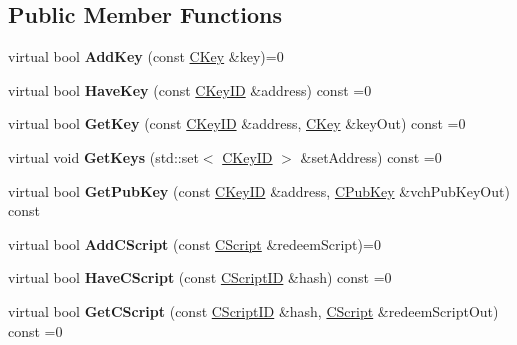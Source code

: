 \subsection*{Public Member Functions}
\begin{DoxyCompactItemize}
\item 
\mbox{\label{class_c_key_store_ae7b69414d2b00f551b2692f83f38a882}} 
virtual bool {\bfseries Add\+Key} (const \mbox{\hyperlink{class_c_key}{C\+Key}} \&key)=0
\item 
\mbox{\label{class_c_key_store_a9398451d4270fae27b29f686a9d43a65}} 
virtual bool {\bfseries Have\+Key} (const \mbox{\hyperlink{class_c_key_i_d}{C\+Key\+ID}} \&address) const =0
\item 
\mbox{\label{class_c_key_store_a2dffca468fef2e5da2e42a7c983d968a}} 
virtual bool {\bfseries Get\+Key} (const \mbox{\hyperlink{class_c_key_i_d}{C\+Key\+ID}} \&address, \mbox{\hyperlink{class_c_key}{C\+Key}} \&key\+Out) const =0
\item 
\mbox{\label{class_c_key_store_aca5044014720308f191113e7ba297d13}} 
virtual void {\bfseries Get\+Keys} (std\+::set$<$ \mbox{\hyperlink{class_c_key_i_d}{C\+Key\+ID}} $>$ \&set\+Address) const =0
\item 
\mbox{\label{class_c_key_store_ab83687ea4c9df138b21f6ec3e9809f42}} 
virtual bool {\bfseries Get\+Pub\+Key} (const \mbox{\hyperlink{class_c_key_i_d}{C\+Key\+ID}} \&address, \mbox{\hyperlink{class_c_pub_key}{C\+Pub\+Key}} \&vch\+Pub\+Key\+Out) const
\item 
\mbox{\label{class_c_key_store_a2fb2e02e8cdc364607efd5ebb14b8064}} 
virtual bool {\bfseries Add\+C\+Script} (const \mbox{\hyperlink{class_c_script}{C\+Script}} \&redeem\+Script)=0
\item 
\mbox{\label{class_c_key_store_a51c9fc86b2c3fece10d86146231fa58d}} 
virtual bool {\bfseries Have\+C\+Script} (const \mbox{\hyperlink{class_c_script_i_d}{C\+Script\+ID}} \&hash) const =0
\item 
\mbox{\label{class_c_key_store_ae6bf4dbeb0705e199250e48aa5d34264}} 
virtual bool {\bfseries Get\+C\+Script} (const \mbox{\hyperlink{class_c_script_i_d}{C\+Script\+ID}} \&hash, \mbox{\hyperlink{class_c_script}{C\+Script}} \&redeem\+Script\+Out) const =0

\end{DoxyCompactItemize}
